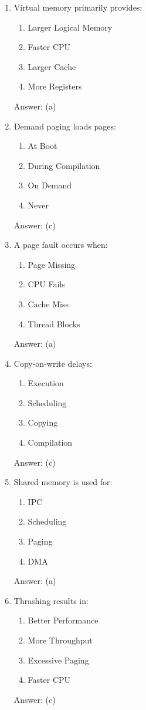 \begin{enumerate}
\item Virtual memory primarily provides:
\begin{enumerate}[label=(\alph*)]
\item Larger Logical Memory
\item Faster CPU
\item Larger Cache
\item More Registers
\end{enumerate}
Answer: (a)

\item Demand paging loads pages:
\begin{enumerate}[label=(\alph*)]
\item At Boot
\item During Compilation
\item On Demand
\item Never
\end{enumerate}
Answer: (c)

\item A page fault occurs when:
\begin{enumerate}[label=(\alph*)]
\item Page Missing
\item CPU Fails
\item Cache Miss
\item Thread Blocks
\end{enumerate}
Answer: (a)

\item Copy-on-write delays:
\begin{enumerate}[label=(\alph*)]
\item Execution
\item Scheduling
\item Copying
\item Compilation
\end{enumerate}
Answer: (c)

\item Shared memory is used for:
\begin{enumerate}[label=(\alph*)]
\item IPC
\item Scheduling
\item Paging
\item DMA
\end{enumerate}
Answer: (a)

\item Thrashing results in:
\begin{enumerate}[label=(\alph*)]
\item Better Performance
\item More Throughput
\item Excessive Paging
\item Faster CPU
\end{enumerate}
Answer: (c)


\end{enumerate}
